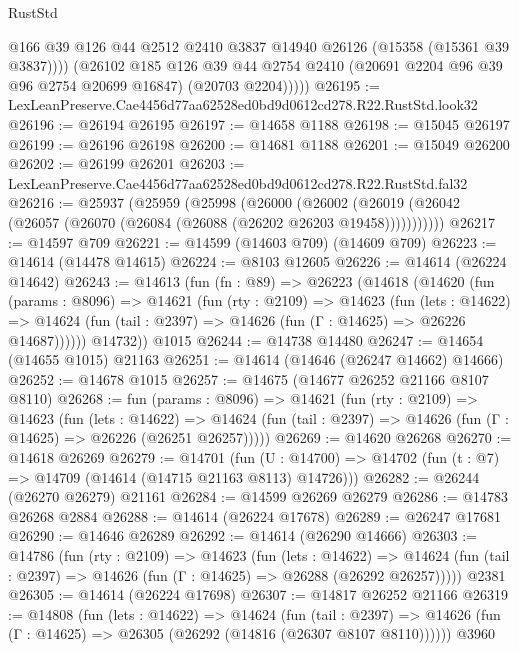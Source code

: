 \begin{lexlean}{RustStd}
\begin{coremodule}
              @166
              @39
              @126
              @44
              @2512
              @2410
              @3837
              @14940
              @26126
              (@15358 (@15361 @39 @3837))))
          (@26102
            @185
            @126
            @39
            @44
            @2754
            @2410
            (@20691 @2204 @96 @39 @96 @2754 @20699 @16847)
            (@20703 @2204)))))
@26195 := LexLeanPreserve.Cae4456d77aa62528ed0bd9d0612cd278.R22.RustStd.look32
@26196 := @26194 @26195
@26197 := @14658 @1188
@26198 := @15045 @26197
@26199 := @26196 @26198
@26200 := @14681 @1188
@26201 := @15049 @26200
@26202 := @26199 @26201
@26203 := LexLeanPreserve.Cae4456d77aa62528ed0bd9d0612cd278.R22.RustStd.fal32
@26216 := @25937
    (@25959
      (@25998
        (@26000
          (@26002 (@26019 (@26042 (@26057 (@26070 (@26084 (@26088 (@26202 @26203 @19458)))))))))))
@26217 := @14597 @709
@26221 := @14599 (@14603 @709) (@14609 @709)
@26223 := @14614 (@14478 @14615)
@26224 := @8103 @12605
@26226 := @14614 (@26224 @14642)
@26243 := @14613
    (fun (fn : @89) =>
    @26223
      (@14618
        (@14620
          (fun (params : @8096) =>
          @14621
            (fun (rty : @2109) =>
            @14623
              (fun (lets : @14622) =>
              @14624 (fun (tail : @2397) => @14626 (fun (Γ : @14625) => @26226 @14687))))))
        @14732))
    @1015
@26244 := @14738 @14480
@26247 := @14654 (@14655 @1015) @21163
@26251 := @14614 (@14646 (@26247 @14662) @14666)
@26252 := @14678 @1015
@26257 := @14675 (@14677 @26252 @21166 @8107 @8110)
@26268 := fun (params : @8096) =>
  @14621
    (fun (rty : @2109) =>
    @14623
      (fun (lets : @14622) =>
      @14624 (fun (tail : @2397) => @14626 (fun (Γ : @14625) => @26226 (@26251 @26257)))))
@26269 := @14620 @26268
@26270 := @14618 @26269
@26279 := @14701
    (fun (U : @14700) => @14702 (fun (t : @7) => @14709 (@14614 (@14715 @21163 @8113) @14726)))
@26282 := @26244 (@26270 @26279) @21161
@26284 := @14599 @26269 @26279
@26286 := @14783 @26268 @2884
@26288 := @14614 (@26224 @17678)
@26289 := @26247 @17681
@26290 := @14646 @26289
@26292 := @14614 (@26290 @14666)
@26303 := @14786
    (fun (rty : @2109) =>
    @14623
      (fun (lets : @14622) =>
      @14624 (fun (tail : @2397) => @14626 (fun (Γ : @14625) => @26288 (@26292 @26257)))))
    @2381
@26305 := @14614 (@26224 @17698)
@26307 := @14817 @26252 @21166
@26319 := @14808
    (fun (lets : @14622) =>
    @14624
      (fun (tail : @2397) =>
      @14626 (fun (Γ : @14625) => @26305 (@26292 (@14816 (@26307 @8107 @8110))))))
    @3960

\end{coremodule}
\end{lexlean}
